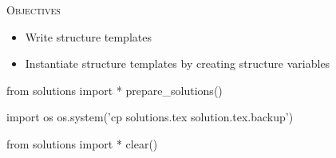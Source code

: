 
\textsc{Objectives}
\begin{itemize}
\item Write structure templates
\item Instantiate structure templates by creating structure variables
\end{itemize}



\begin{python0}
from solutions import *
prepare_solutions()
\end{python0}
\begin{python}
import os
os.system('cp solutions.tex solution.tex.backup')  
\end{python}

\begin{python0}
from solutions import *
clear()
\end{python0}
